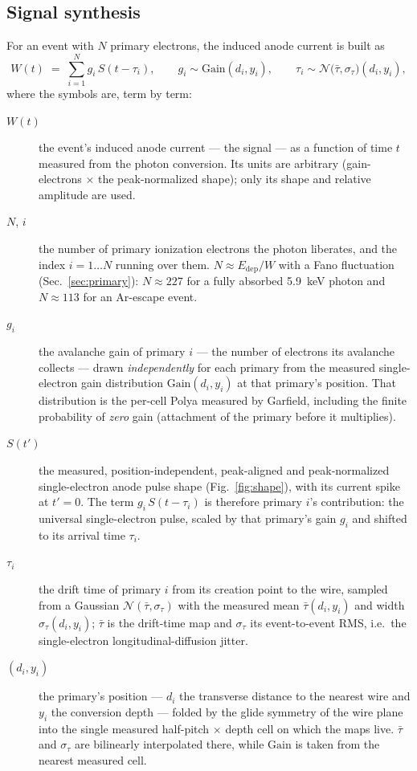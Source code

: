 \documentclass[11pt,a4paper]{article}
\begin{document}
\subsection{Signal synthesis}
For an event with $N$ primary electrons, the induced anode current is built as
\begin{equation}
  W(t) \;=\; \sum_{i=1}^{N} g_i \, S\!\left(t-\tau_i\right),
  \qquad
  g_i \sim \mathrm{Gain}(d_i,y_i),
  \qquad
  \tau_i \sim \mathcal{N}\!\big(\bar\tau,\sigma_\tau\big)(d_i,y_i),
  \label{eq:sum}
\end{equation}
\noindent where the symbols are, term by term:
\begin{description}
  \item[$W(t)$] the event's induced anode current --- the signal --- as a function of time $t$ measured
        from the photon conversion. Its units are arbitrary (gain-electrons $\times$ the peak-normalized
        shape); only its shape and relative amplitude are used.
  \item[$N$, $i$] the number of primary ionization electrons the photon liberates, and the index
        $i=1\dots N$ running over them. $N\approx E_\mathrm{dep}/W$ with a Fano fluctuation
        (Sec.~\ref{sec:primary}): $N\approx227$ for a fully absorbed 5.9~keV photon and $N\approx113$
        for an Ar-escape event.
  \item[$g_i$] the avalanche gain of primary $i$ --- the number of electrons its avalanche collects ---
        drawn \emph{independently} for each primary from the measured single-electron gain distribution
        $\mathrm{Gain}(d_i,y_i)$ at that primary's position. That distribution is the per-cell Polya
        measured by Garfield, including the finite probability of \emph{zero} gain (attachment of the
        primary before it multiplies).
  \item[$S(t')$] the measured, position-independent, peak-aligned and peak-normalized single-electron
        anode pulse shape (Fig.~\ref{fig:shape}), with its current spike at $t'=0$. The term
        $g_i\,S(t-\tau_i)$ is therefore primary $i$'s contribution: the universal single-electron pulse,
        scaled by that primary's gain $g_i$ and shifted to its arrival time $\tau_i$.
  \item[$\tau_i$] the drift time of primary $i$ from its creation point to the wire, sampled from a
        Gaussian $\mathcal{N}(\bar\tau,\sigma_\tau)$ with the measured mean $\bar\tau(d_i,y_i)$ and width
        $\sigma_\tau(d_i,y_i)$; $\bar\tau$ is the drift-time map and $\sigma_\tau$ its event-to-event
        RMS, i.e.\ the single-electron longitudinal-diffusion jitter.
  \item[$(d_i,y_i)$] the primary's position --- $d_i$ the transverse distance to the nearest wire and
        $y_i$ the conversion depth --- folded by the glide symmetry of the wire plane into the single
        measured half-pitch $\times$ depth cell on which the maps live. $\bar\tau$ and $\sigma_\tau$ are
        bilinearly interpolated there, while $\mathrm{Gain}$ is taken from the nearest measured cell.
\end{description}
\end{document}
